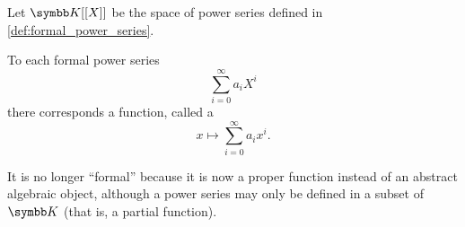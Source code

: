 \begin{definition}\label{def:convergent_power_series}
  Let \( \K[[X]] \) be the space of power series defined in \cref{def:formal_power_series}.

  To each formal power series
  \begin{equation*}
    \sum_{i=0}^\infty a_i X^i
  \end{equation*}
  there corresponds a function, called a 
  \begin{equation*}
    x \mapsto \sum_{i=0}^\infty a_i x^i.
  \end{equation*}

  It is no longer \enquote{formal} because it is now a proper function instead of an abstract algebraic object, although a power series may only be defined in a subset of \( \K \) (that is, a partial function).
\end{definition}
